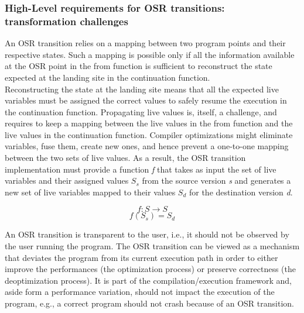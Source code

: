 \subsubsection{High-Level requirements for OSR transitions: transformation challenges}\label{HLREQ}

An OSR transition relies on a mapping between two program points and their respective states.
Such a mapping is possible only if all the information available at the OSR point in the from function is sufficient to reconstruct the state expected at the landing site in the continuation function.\\

Reconstructing the state at the landing site means that all the expected live variables must be assigned the correct values to safely resume the execution in the continuation function.
Propagating live values is, itself, a challenge, and requires to keep a mapping between the live values in the from function and the live values in the continuation function.
Compiler optimizations might eliminate variables, fuse them, create new ones, and hence prevent a one-to-one mapping between the two sets of live values. 
As a result, the OSR transition implementation must provide a function \textit{f} that takes as input the set of live variables and their assigned values $S_s$ from the source version \textit{s} and generates a new set of live variables mapped to their values $S_d$ for the destination version \textit{d}.

\[f: S \rightarrow S\]
\[f(S_s) = S_d\]

An OSR transition is transparent to the user, i.e., it should not be observed by the user running the program.
The OSR transition can be viewed as a mechanism that deviates the program from its current execution path in order to either improve the performances (the optimization process) or preserve correctness (the deoptimization process).
It is part of the compilation/execution framework and, aside form a performance variation, should not impact the execution of the program, e.g., a correct program should not crash because of an OSR transition.\\


